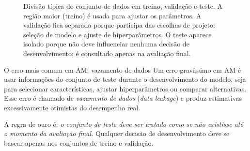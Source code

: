 \documentclass[12pt,a4paper]{article}
\begin{document}
\begin{figure}[ht]
\centering
{}
\caption{Divisão típica do conjunto de dados em treino, validação e teste. A região maior (treino) é usada para ajustar os parâmetros. A validação fica separada porque participa das escolhas de projeto: seleção de modelo e ajuste de hiperparâmetros. O teste aparece isolado porque não deve influenciar nenhuma decisão de desenvolvimento; é consultado apenas na avaliação final.}
\label{fig:divisao-dados}
\end{figure}

\begin{alertabox}{O erro mais comum em AM: vazamento de dados}
Um erro gravíssimo em AM é usar informações do conjunto de teste durante o desenvolvimento do modelo, seja para selecionar características, ajustar hiperparâmetros ou comparar alternativas. Esse erro é chamado de \emph{vazamento de dados} (\textit{data leakage}) e produz estimativas excessivamente otimistas do desempenho real.

A regra de ouro é: \emph{o conjunto de teste deve ser tratado como se não existisse até o momento da avaliação final.} Qualquer decisão de desenvolvimento deve se basear apenas nos conjuntos de treino e validação.
\end{alertabox}
\end{document}
